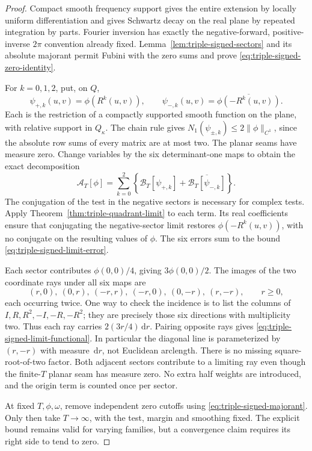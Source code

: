 \documentclass[11pt]{article}
\newcommand{\dd}{\,\mathrm d}
\begin{document}
\begin{proof}
Compact smooth frequency support gives the entire extension by locally
uniform differentiation and gives Schwartz decay on the real plane by
repeated integration by parts. Fourier inversion has exactly the
negative-forward, positive-inverse \(2\pi\) convention already fixed.
Lemma~\ref{lem:triple-signed-sectors} and its absolute majorant permit
Fubini with the zero sums and prove \eqref{eq:triple-signed-zero-identity}.

For \(k=0,1,2\), put, on \(Q\),
\[
 \psi_{+,k}(u,v)=\phi(R^k(u,v)),\qquad
 \psi_{-,k}(u,v)=\overline{\phi(-R^k(u,v))}.
\]
Each is the restriction of a compactly supported smooth function on
the plane, with relative support in \(Q_\kappa\). The chain rule gives
\(N_1(\psi_{\pm,k})\leq2\|\phi\|_{C^1}\), since the absolute
row sums of every matrix are at most two. The planar seams have measure
zero. Change variables by the six determinant-one maps to obtain
the exact decomposition
\begin{equation}\label{eq:triple-six-sector-decomposition}
 \mathcal A_T[\phi]
 =\sum_{k=0}^2\left\{\mathcal B_T[\psi_{+,k}]
                   +\overline{\mathcal B_T[\psi_{-,k}]}\right\}.
\end{equation}
The conjugation of the test in the negative sectors is necessary for
complex tests. Apply Theorem~\ref{thm:triple-quadrant-limit} to each
term. Its real coefficients ensure that conjugating the negative-sector
limit restores \(\phi(-R^k(u,v))\), with no conjugate on the resulting
values of \(\phi\). The six errors sum to the bound
\eqref{eq:triple-signed-limit-error}.

Each sector contributes \(\phi(0,0)/4\), giving \(3\phi(0,0)/2\).
The images of the two coordinate rays under all six maps are
\[
 (r,0),\ (0,r),\ (-r,r),\ (-r,0),\ (0,-r),\ (r,-r),
 \qquad r\geq0,
\]
each occurring twice. One way to check the incidence is to list the
columns of \(I,R,R^2,-I,-R,-R^2\); they are precisely those six
directions with multiplicity two. Thus each ray carries
\(2(3r/4)\dd r\). Pairing opposite rays gives
\eqref{eq:triple-signed-limit-functional}. In particular the diagonal
line is parameterized by \((r,-r)\) with measure \(\dd r\), not
Euclidean arclength. There is no missing square-root-of-two factor.
Both adjacent sectors contribute to a limiting ray even though the
finite-\(T\) planar seam has measure zero. No extra half weights are
introduced, and the origin term is counted once per sector.

At fixed \(T,\phi,\omega\), remove independent zero cutoffs using
\eqref{eq:triple-signed-majorant}. Only then take \(T\to\infty\),
with the test, margin and smoothing fixed. The explicit bound remains
valid for varying families, but a convergence claim requires its right
side to tend to zero.
\end{proof}
\end{document}
